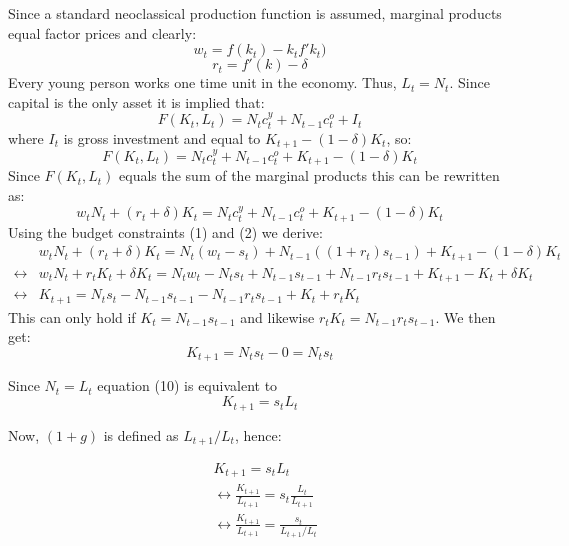 \documentclass[11pt,a4paper]{article}
\begin{document}
Since a standard neoclassical production function is assumed, marginal products equal factor prices and clearly:
\begin{equation}
w_t=f(k_t)-k_tf'k_t)
\end{equation}
\begin{equation}
r_t=f'(k)-\delta
\end{equation}
Every young person works one time unit in the economy. Thus, $L_t=N_t$. Since capital is the only asset it is implied that:
\begin{equation}
F(K_t,L_t)=N_tc^y_t+N_{t-1}c^o_t+I_t
\end{equation}
where $I_t$ is gross investment and equal to $K_{t+1}-(1-\delta)K_t$, so:
\begin{equation}
F(K_t,L_t)=N_tc^y_t+N_{t-1}c^o_t+K_{t+1}-(1-\delta)K_t
\end{equation}
Since $F(K_t,L_t)$ equals the sum of the marginal products this can be rewritten as:
\begin{equation}
w_tN_t+(r_t+\delta)K_t=N_tc^y_t+N_{t-1}c^o_t+K_{t+1}-(1-\delta)K_t
\end{equation}
Using the budget constraints (1) and (2) we derive:
\begin{align*}
&w_tN_t+(r_t+\delta)K_t=N_t(w_t-s_t)+N_{t-1}((1+r_{t})s_{t-1})+K_{t+1}-(1-\delta)K_t \\
\leftrightarrow& w_tN_t+r_tK_t+\delta K_t=N_tw_t-N_ts_t+N_{t-1}s_{t-1}+N_{t-1}r_{t}s_{t-1}+K_{t+1}-K_t+\delta K_t \\
\leftrightarrow&K_{t+1}=N_ts_t-N_{t-1}s_{t-1}-N_{t-1}r_{t}s_{t-1}+K_t+r_tK_t
\end{align*}
This can only hold if $K_{t}=N_{t-1}s_{t-1}$ and likewise $r_tK_t=N_{t-1}r_{t}s_{t-1}$. We then get:
\begin{equation}
K_{t+1}=N_ts_t-0=N_ts_t
\end{equation}

Since $N_t=L_t$ equation (10) is equivalent to
\begin{equation}
K_{t+1}=s_tL_t
\end{equation}

Now, $(1+g)$ is defined as $L_{t+1}/L_t$, hence:

\begin{align*}
& K_{t+1}=s_tL_t \\
& \leftrightarrow \frac{K_{t+1}}{L_{t+1}}=s_t\frac{L_t}{L_{t+1}} \\
& \leftrightarrow \frac{K_{t+1}}{L_{t+1}}=\frac{s_t}{L_{t+1}/L_{t}}
\end{align*}
\end{document}

